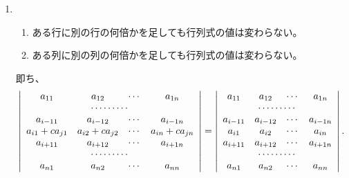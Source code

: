 \begin{enumerate}
\item \begin{enumerate}
	\item ある行に別の行の何倍かを足しても行列式の値は変わらない。
	\item ある列に別の列の何倍かを足しても行列式の値は変わらない。
	\end{enumerate}
	即ち、
$$\left|\begin{array}{cccc}a_{11} & a_{12} & \cdots & a_{1n} \\
\multicolumn{4}{c}{\cdots\cdots\cdots}\\
a_{i-11} & a_{i-12} & \cdots & a_{i-1n}\\
a_{i1}+ca_{j1} & a_{i2}+ca_{j2} & \cdots & a_{in}+ca_{jn}\\
a_{i+11} & a_{i+12} & \cdots & a_{i+1n}\\
\multicolumn{4}{c}{\cdots\cdots\cdots}\\
a_{n1} & a_{n2} & \cdots & a_{nn}
\end{array}\right| = 
\left|\begin{array}{cccc}a_{11} & a_{12} & \cdots & a_{1n} \\
\multicolumn{4}{c}{\cdots\cdots\cdots}\\
a_{i-11} & a_{i-12} & \cdots & a_{i-1n}\\
a_{i1} & a_{i2} & \cdots & a_{in}\\
a_{i+11} & a_{i+12} & \cdots & a_{i+1n}\\
\multicolumn{4}{c}{\cdots\cdots\cdots}\\
a_{n1} & a_{n2} & \cdots & a_{nn}
\end{array}\right|.$$


\end{enumerate}
